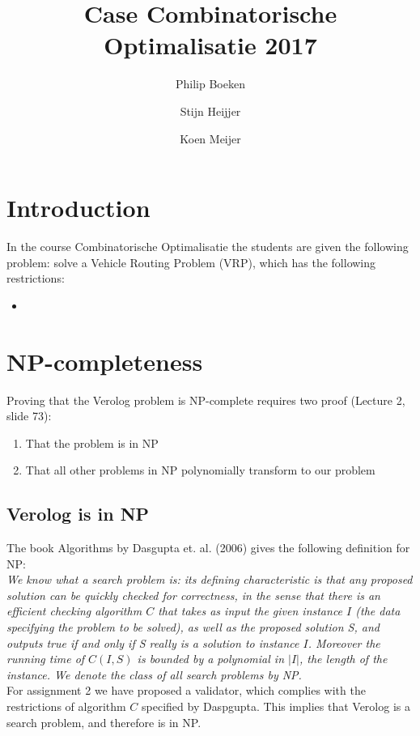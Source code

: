 \documentclass[a4paper]{article}
\title{Case Combinatorische Optimalisatie 2017}
\author{Philip Boeken \and Stijn Heijjer \and Koen Meijer}
\begin{document}
\maketitle
\section{Introduction}
In the course Combinatorische Optimalisatie the students are given the following problem: solve a Vehicle Routing Problem (VRP), which has the following restrictions:
\begin{itemize}
	\item 
\end{itemize}

\section{NP-completeness}
Proving that the Verolog problem is NP-complete requires two proof (Lecture 2, slide 73):
\begin{enumerate}
	\item That the problem is in NP
	\item That all other problems in NP polynomially transform to our problem
\end{enumerate}

\subsection{Verolog is in NP}
The book Algorithms by Dasgupta et. al. (2006) gives the following definition for NP: \\

\emph{We know what a search problem is: its defining characteristic is that any proposed solution can be quickly checked for correctness, in the sense that there is an efficient checking algorithm $C$ that takes as input the given instance $I$ (the data specifying the problem to be solved), as well as the proposed solution S, and outputs true if and only if S really is a solution to instance $I$. Moreover the running time of $C(I,S)$ is bounded by a polynomial in $|I|$, the length of the instance. We denote the class of all search problems by NP.} \\

For assignment 2 we have proposed a validator, which complies with the restrictions of algorithm $C$ specified by Daspgupta. This implies that Verolog is a search problem, and therefore is in NP.\\
\end{document}
